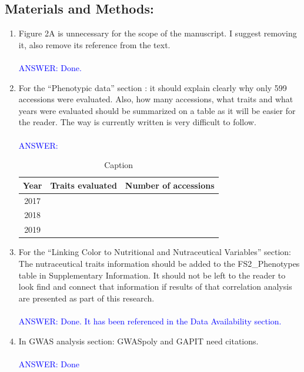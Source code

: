 \documentclass{article}
\begin{document}
\subsection{Materials and Methods:}
\begin{enumerate}
    \item Figure 2A is unnecessary for the scope of the manuscript. I suggest removing it, also remove its reference from the text.\\\\
    \textcolor{blue}{ANSWER: Done.}
    \item For the “Phenotypic data” section : it should explain clearly why only 599 accessions were evaluated. Also, how many accessions, what traits and what years were evaluated should be summarized on a table as it will be easier for the reader. The way is currently written is very difficult to follow.\\\\
    
    \textcolor{blue}{ANSWER: }
\begin{table}[!h]
    \centering
    \begin{tabular}{|c|c|c|}
    \hline
    
      Year   & Traits evaluated & Number of accessions \\\hline
       2017  &  & \\
       2018  &  & \\
       2019  &  & \\\hline 
    \end{tabular}
   
    \caption{Caption}
    \label{tab:placeholder}
\end{table}

    
    \item For the “Linking Color to Nutritional and Nutraceutical Variables” section: The nutraceutical traits information should be added to the FS2\_Phenotypes table in Supplementary Information. It should not be left to the reader to look find and connect that information if results of that correlation analysis are presented as part of this research.\\\\
    \textcolor{blue}{ANSWER: Done. It has been referenced in the Data Availability section.}
    \item In GWAS analysis section: GWASpoly and GAPIT need citations.\\\\
    \textcolor{blue}{ANSWER: Done}
\end{enumerate}
\end{document}

